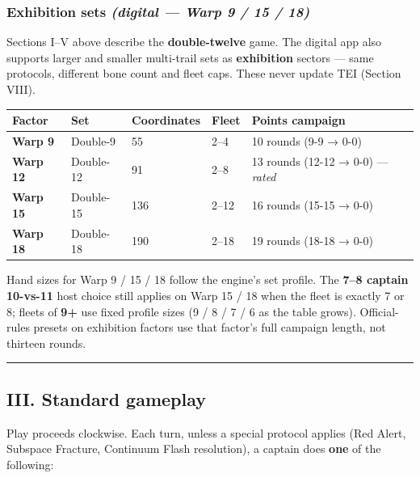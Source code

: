 \documentclass[11pt]{article}
\begin{document}
\subsubsection{\texorpdfstring{Exhibition sets \emph{(digital --- Warp 9
/ 15 /
18)}}{Exhibition sets (digital --- Warp 9 / 15 / 18)}}\label{exhibition-sets-digital--warp-9--15--18}

Sections I--V above describe the \textbf{double-twelve} game. The
digital app also supports larger and smaller multi-trail sets as
\textbf{exhibition} sectors --- same protocols, different bone count and
fleet caps. These never update TEI (Section VIII).

\begin{longtable}[]{@{}lllll@{}}
\toprule\noalign{}
Factor & Set & Coordinates & Fleet & Points campaign \\
\midrule\noalign{}
\endhead
\bottomrule\noalign{}
\endlastfoot
\textbf{Warp 9} & Double-9 & 55 & 2--4 & 10 rounds (9-9 → 0-0) \\
\textbf{Warp 12} & Double-12 & 91 & 2--8 & 13 rounds (12-12 → 0-0) ---
\emph{rated} \\
\textbf{Warp 15} & Double-15 & 136 & 2--12 & 16 rounds (15-15 → 0-0) \\
\textbf{Warp 18} & Double-18 & 190 & 2--18 & 19 rounds (18-18 → 0-0) \\
\end{longtable}

Hand sizes for Warp 9 / 15 / 18 follow the engine's set profile. The
\textbf{7--8 captain 10-vs-11} host choice still applies on Warp 15 / 18
when the fleet is exactly 7 or 8; fleets of \textbf{9+} use fixed
profile sizes (9 / 8 / 7 / 6 as the table grows). Official-rules presets
on exhibition factors use that factor's full campaign length, not
thirteen rounds.

\begin{center}\rule{0.5\linewidth}{0.5pt}\end{center}

\subsection{III. Standard gameplay}\label{iii-standard-gameplay}

Play proceeds clockwise. Each turn, unless a special protocol applies
(Red Alert, Subspace Fracture, Continuum Flash resolution), a captain
does \textbf{one} of the following:
\end{document}
